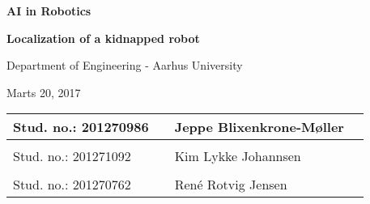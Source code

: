 
\centerline{\Huge\bfseries\color{ThemeColor} AI in Robotics}

\vspace{1em}
\centerline{\Large\bfseries\color{BlackColor} Localization of a kidnapped robot}



\vspace{5em}
\centerline{\large\bfseries\color{BlackColor}}
\centerline{\large\color{BlackColor}Department of Engineering - Aarhus University}

\vspace{0.5em}
\centerline{\large\color{BlackColor} Marts 20, 2017}

\vspace{25em}

\begin{center}
   \begin{tabular}{ l p{3cm} l l }
   Stud. no.: 201270986 && Jeppe Blixenkrone-Møller & \\\hline
   & & \\
   Stud. no.: 201271092 && Kim Lykke Johannsen & \\\hline
   & & \\
   Stud. no.: 201270762 && René Rotvig Jensen & \\\hline
   \end{tabular}
\end{center}
\thispagestyle{empty} %
\restoregeometry

